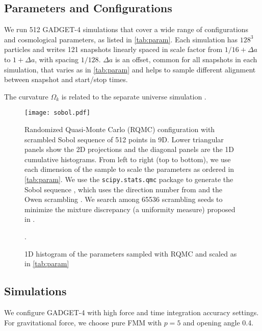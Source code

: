 \documentclass[usenatbib]{mnras}
\begin{document}
\subsection{Parameters and Configurations}

We run 512 GADGET-4 simulations that cover a wide range of
configurations and cosmological parameters, as listed in
\autoref{tab:param}.
Each simulation has $128^3$ particles and writes 121 snapshots linearly
spaced in scale factor from $1/16 + \Delta a$ to $1 + \Delta a$, with
spacing $1/128$.
$\Delta a$ is an offset, common for all snapshots in each simulation,
that varies as in \autoref{tab:param} and helps to sample different
alignment between snapshot and start/stop times.

The curvature $\Omega_k$ is related to the separate universe simulation
\citep{LiEtAl2014a, WagnerEtAl2015}.


\begin{figure*}
  \centering
  \texttt{[image: sobol.pdf]}
  \caption{Randomized Quasi-Monte Carlo (RQMC) configuration with
    scrambled Sobol sequence of 512 points in 9D.
    Lower triangular panels show the 2D projections and the diagonal
    panels are the 1D cumulative histograms.
    From left to right (top to bottom), we use each dimension of the
    sample to scale the parameters as ordered in \autoref{tab:param}.
    We use the \texttt{scipy.stats.qmc} package \citep{SciPy} to
    generate the Sobol sequence \citep{Sobol1967}, which uses the
    direction number from \citet{JoeKuo2008} and the Owen scrambling
    \citep{Owen1998}.
    We search among 65536 scrambling seeds to minimize the mixture
    discrepancy (a uniformity measure) proposed in \citet{Zhou2013MD}.
  }
  \label{fig:sobol}
\end{figure*}

\begin{figure*}
  \centering
  \caption{1D histogram of the parameters sampled with RQMC and scaled
  as in \autoref{tab:param}}.
  \label{fig:hist}
\end{figure*}


\subsection{Simulations}

\citet{GADGET-4}

We configure GADGET-4 with high force and time integration accuracy
settings.
For gravitational force, we choose pure FMM with $p=5$ and opening angle
0.4.
\end{document}
